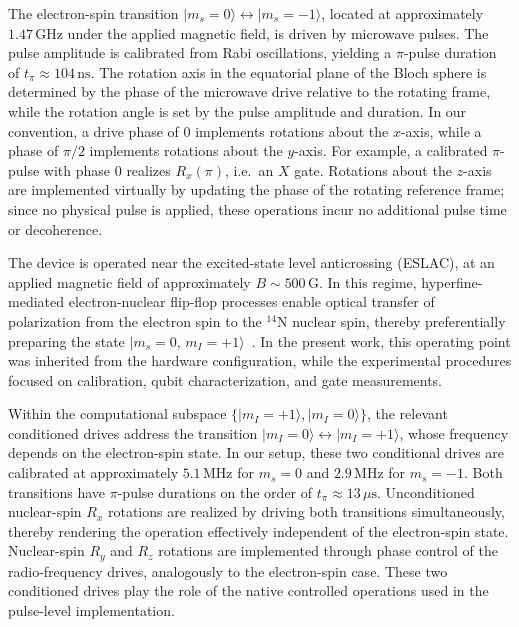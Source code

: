 \documentclass[conference]{IEEEtran}
\begin{document}
The electron-spin transition \(|m_s=0\rangle\leftrightarrow|m_s=-1\rangle\),
located at approximately \(1.47\,\mathrm{GHz}\) under the applied magnetic
field, is driven by microwave pulses. The pulse amplitude is calibrated from
Rabi oscillations, yielding a \(\pi\)-pulse duration of \(t_\pi\approx
104\,\mathrm{ns}\). The rotation axis in the equatorial plane of the Bloch
sphere is determined by the phase of the microwave drive relative to the
rotating frame, while the rotation angle is set by the pulse amplitude and
duration. In our convention, a drive phase of \(0\) implements rotations about
the \(x\)-axis, while a phase of \(\pi/2\) implements rotations about the
\(y\)-axis. For example, a calibrated \(\pi\)-pulse with phase \(0\) realizes
\(R_x(\pi)\), i.e.\ an \(X\) gate. Rotations about the \(z\)-axis are
implemented virtually by updating the phase of the rotating reference frame;
since no physical pulse is applied, these operations incur no additional pulse
time or decoherence.

The device is operated near the excited-state level anticrossing (ESLAC), at an
applied magnetic field of approximately \(B\sim 500\,\mathrm{G}\). In this
regime, hyperfine-mediated electron-nuclear flip-flop processes enable optical
transfer of polarization from the electron spin to the \({}^{14}\mathrm N\)
nuclear spin, thereby preferentially preparing the state
\(|m_s=0,\,m_I=+1\rangle\)~\cite{he2024direct}. In the present work, this
operating point was inherited from the hardware configuration, while the
experimental procedures focused on calibration, qubit characterization, and gate
measurements.

Within the computational subspace \(\{|m_I=+1\rangle, |m_I=0\rangle\}\), the
relevant conditioned drives address the transition
\(|m_I=0\rangle\leftrightarrow|m_I=+1\rangle\), whose frequency depends on the
electron-spin state. In our setup, these two conditional drives are calibrated
at approximately \(5.1\,\mathrm{MHz}\) for \(m_s=0\) and \(2.9\,\mathrm{MHz}\)
for \(m_s=-1\). Both transitions have \(\pi\)-pulse durations on the order of
\(t_\pi\approx 13\,\mu\mathrm{s}\). Unconditioned nuclear-spin \(R_x\) rotations
are realized by driving both transitions simultaneously, thereby rendering the
operation effectively independent of the electron-spin state. Nuclear-spin
\(R_y\) and \(R_z\) rotations are implemented through phase control of the
radio-frequency drives, analogously to the electron-spin case. These two
conditioned drives play the role of the native controlled operations used in the
pulse-level implementation.
\end{document}
